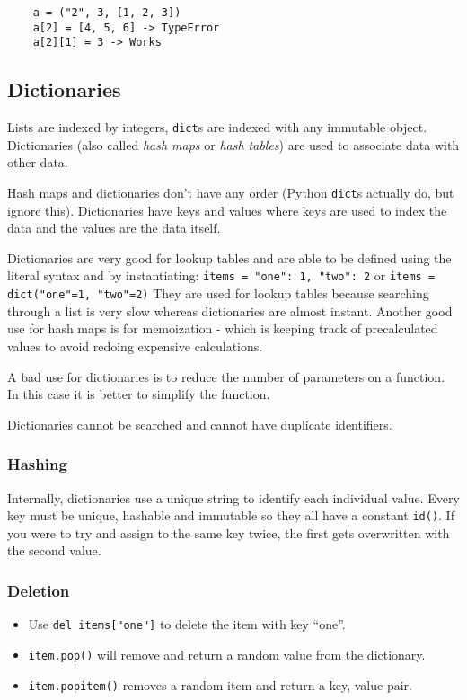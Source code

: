 \begin{verbatim}
    a = ("2", 3, [1, 2, 3])
    a[2] = [4, 5, 6] -> TypeError
    a[2][1] = 3 -> Works
\end{verbatim}

\subsection{Dictionaries}\label{sub:dictionaries}

Lists are indexed by integers, \texttt{dict}s are indexed with any immutable object.
Dictionaries (also called \emph{hash maps} or \emph{hash tables}) are used to associate data with other data.

Hash maps and dictionaries don't have any order (Python \texttt{dict}s actually do, but ignore this).
Dictionaries have keys and values where keys are used to index the data and the values are the data itself.

Dictionaries are very good for lookup tables and are able to be defined using the literal syntax and by instantiating: \texttt{items = {"one": 1, "two": 2}} or \texttt{items = dict("one"=1, "two"=2)}
They are used for lookup tables because searching through a list is very slow whereas dictionaries are almost instant.
Another good use for hash maps is for memoization - which is keeping track of precalculated values to avoid redoing expensive calculations.

A bad use for dictionaries is to reduce the number of parameters on a function.
In this case it is better to simplify the function.

\begin{note}
	Dictionaries cannot be searched and cannot have duplicate identifiers.
\end{note}

\subsubsection{Hashing}\label{ssub:hashing}

Internally, dictionaries use a unique string to identify each individual value.
Every key must be unique, hashable and immutable so they all have a constant \texttt{id()}.
If you were to try and assign to the same key twice, the first gets overwritten with the second value.

\subsubsection{Deletion}\label{ssub:deletion}

\begin{itemize}
	\item Use \texttt{del items["one"]} to delete the item with key ``one''.
	\item \texttt{item.pop()} will remove and return a random value from the dictionary.
	\item \texttt{item.popitem()} removes a random item and return a key, value pair.
\end{itemize}
